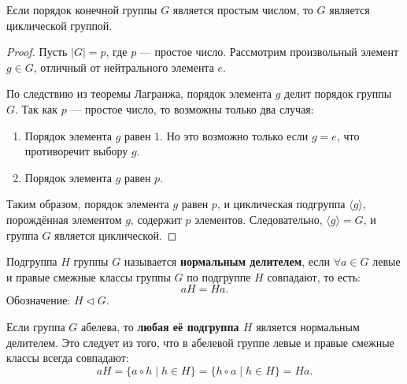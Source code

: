 \begin{shcor}
    \begin{corollary}
        Если порядок конечной группы \( G \) является простым числом, то \( G \) является циклической группой.
    \end{corollary}
\end{shcor}

\begin{proof}
    Пусть \( |G| = p \), где \( p \) — простое число. Рассмотрим произвольный элемент \( g \in G \), отличный от нейтрального элемента \( e \). 

    По следствию из теоремы Лагранжа, порядок элемента \( g \) делит порядок группы \( G \). Так как \( p \) — простое число, то возможны только два случая:
    \begin{enumerate}
        \item Порядок элемента \( g \) равен \( 1 \). Но это возможно только если \( g = e \), что противоречит выбору \( g \).
        \item Порядок элемента \( g \) равен \( p \).
    \end{enumerate}

    Таким образом, порядок элемента \( g \) равен \( p \), и циклическая подгруппа \( \langle g \rangle \), порождённая элементом \( g \), содержит \( p \) элементов. Следовательно, \( \langle g \rangle = G \), и группа \( G \) является циклической.
\end{proof}

\begin{shdef}
    \begin{definition}
    \leavevmode \nl 
    
        Подгруппа \( H \) группы \( G \) называется \textbf{нормальным делителем}, если \( \forall a \in G \) левые и правые смежные классы группы \( G \) по подгруппе \( H \) совпадают, то есть:
        \[
        aH = Ha.
        \]
        Обозначение: \( H \triangleleft G \).
    \end{definition}
\end{shdef}


\begin{remark}
    Если группа \( G \) абелева, то \textbf{любая её подгруппа \( H \)} является нормальным делителем. Это следует из того, что в абелевой группе левые и правые смежные классы всегда совпадают:
    \[
    aH = \{ a \circ h \mid h \in H \} = \{ h \circ a \mid h \in H \} = Ha.
    \]
\end{remark}

